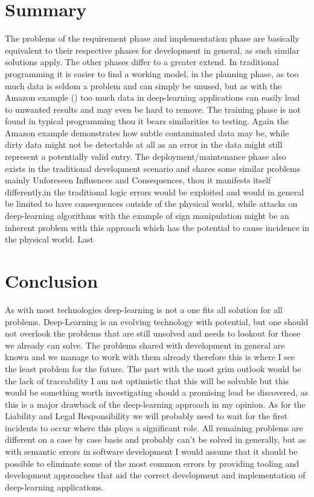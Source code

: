 \section{Summary}

The problems of the requirement phase and implementation phase are basically equivalent to their respective phases for development in general, as such similar solutions apply. The other phases differ to a greater extend. In traditional programming it is easier to find a working model, in the planning phase, as too much data is seldom a problem and can simply be unused, but as with the Amazon example (\cite{Higginbottom2018}) too much data in deep-learning applications can easily lead to unwanted results and may even be hard to remove.
The training phase is not found in typical programming thou it bears similarities to testing. Again the Amazon example demonstrates how subtle contaminated data may be, while dirty data might not be detectable at all as an error in the data might still represent a potentially valid entry. The deployment/maintenance phase also exists in the traditional development scenario and shares some similar problems mainly Unforeseen Influences and Consequences, thou it manifests itself differently,in the traditional logic errors would be exploited and would in general be limited to have consequences outside of the physical world,
while attacks on deep-learning algorithms with the example of sign manipulation
might be an inherent problem with this approach which has the potential to cause incidence in the physical world. Last 

\section{Conclusion}
As with most technologies deep-learning is not a one fits all solution for all problems. Deep-Learning is an evolving technology with potential, but one should not overlook the problems that are still unsolved and needs to lookout for those we already can solve. The problems shared with development in general are known and we manage to work with them already therefore this is where I see the least problem for the future. The part with the most grim outlook would be the lack of traceability I am not optimistic that this will be solvable but this would be something worth investigating should a promising lead be discovered, as this is a major drawback of the deep-learning approach in my opinion. As for the Liability and Legal Responsibility we will probably need to wait for the first incidents to occur where this plays a significant role. All remaining problems are different on a case by case basis and probably can't be solved in generally, but as with semantic errors in software development I would assume that it should be possible to eliminate some of the most common errors by providing tooling and development approaches that aid the correct development and implementation of deep-learning applications.

